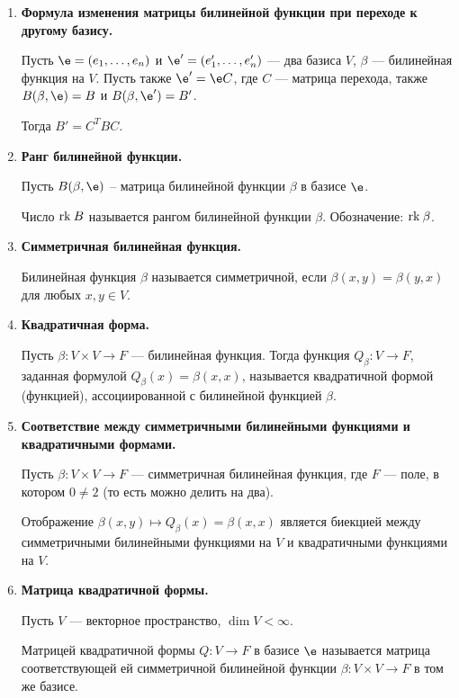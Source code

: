 \begin{enumerate}
\item \textbf{Формула изменения матрицы билинейной функции при переходе к другому базису.} 

Пусть $\e = (e_1, \ldots, e_n)$ и $\e' = (e'_1, \ldots, e'_n)$ --- два базиса $V$, $\beta$ --- билинейная функция на $V$. Пусть также $\e' = \e C$, где $C$ --- матрица перехода, также $B(\beta, \e) = B$ и $B(\beta, \e') = B'$.

Тогда $B' = C^TBC$.

\item \textbf{Ранг билинейной функции.}

Пусть $B(\beta, \e)$ -- матрица билинейной функции $\beta$ в базисе $\e$.

Число $\mathrm{rk}\: B$ называется рангом билинейной функции $\beta$. Обозначение: $\mathrm{rk}\: \beta$.

\item \textbf{Симметричная билинейная функция.}

Билинейная функция $\beta$ называется симметричной, если $\beta(x, y) =\beta(y, x)$ для любых $x, y \in V$.

\item \textbf{Квадратичная форма.}

Пусть $\beta \colon V\times V \rightarrow F$ --- билинейная функция. Тогда функция $Q_\beta \colon V \rightarrow F$, заданная формулой $Q_\beta(x) = \beta(x, x)$, называется квадратичной формой (функцией), ассоциированной с билинейной функцией $\beta$.

\item \textbf{Соответствие между симметричными билинейными функциями и квадратичными формами.}

Пусть $\beta \colon V\times V \rightarrow F$ --- симметричная билинейная функция, где $F$ --- поле, в котором $0 \neq 2$ (то есть можно делить на два).

Отображение $\beta(x, y) \mapsto Q_\beta(x) = \beta(x, x)$ является биекцией между симметричными билинейными функциями на $V$ и квадратичными функциями на $V$.

\item \textbf{Матрица квадратичной формы.}

Пусть $V$ --- векторное пространство, $\dim V < \infty$.

Матрицей квадратичной формы $Q \colon V \to F$   в базисе $\e$ называется матрица  соответствующей ей симметричной билинейной функции $\beta \colon V \times V \rightarrow F$ в том же базисе. 
\end{enumerate}

